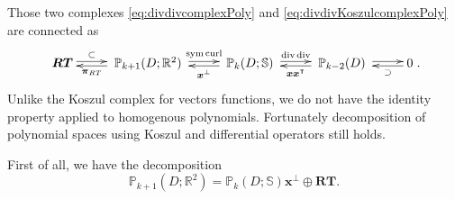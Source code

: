 Those two complexes \eqref{eq:divdivcomplexPoly} and \eqref{eq:divdivKoszulcomplexPoly} are connected as
\begin{equation}\label{eq:divdivcomplexPolydouble}
\xymatrix{
\boldsymbol{RT}\ar@<0.4ex>[r]^-{\subset} & \; \mathbb P_{k+1}(D;\mathbb R^2)\; \ar@<0.4ex>[r]^-{\sym\curl}\ar@<0.4ex>[l]^-{\boldsymbol \pi_{RT}}  & \; \mathbb P_k(D;\mathbb S) \ar@<0.4ex>[r]^-{\div{\div}}\; \ar@<0.4ex>[l]^-{\boldsymbol x^{\bot}} & \; \mathbb P_{k-2}(D)  \; \ar@<0.4ex>[r]^-{} \ar@<0.4ex>[l]^-{\boldsymbol x\boldsymbol x^{\intercal}}
& 0 \ar@<0.4ex>[l]^-{\supset} }.
\end{equation}
Unlike the Koszul complex for vectors functions, we do not have the identity property applied to homogenous polynomials. Fortunately decomposition of polynomial spaces using Koszul and differential operators still holds.

First of all, we have the decomposition
\[
\mathbb P_{k+1}(D;\mathbb R^2) = \mathbb P_k(D;\mathbb S)\boldsymbol x^{\perp}\oplus\boldsymbol{RT}.
\]

